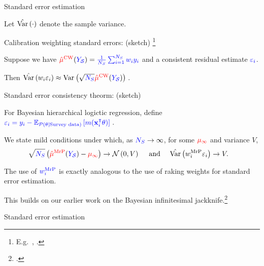 \begin{frame}[c]{Standard error estimation}


Let $\hat{\mathrm{Var}}\left(\cdot\right)$ denote the sample variance.

\begin{block}{Calibration weighting standard errors: (sketch)
    \footnote{E.g.~, \textcite{deville:1993:generalizedraking,fuller:2011:sampling}.}
}

Suppose we have $\textcolor{red}{\hat{\mu}^{\mathrm{CW}}}(\textcolor{blue}{\textcolor{blue}{Y_{\mathcal{S}}}}) = \textcolor{blue}{\frac{1}{{\textcolor{blue}{N_S}}} \sum_{i=1}^{\textcolor{blue}{N_S}} w_i y_i}$ and a
consistent residual estimate $\textcolor{blue}{\varepsilon_i}$.

Then $\hat{\mathrm{Var}}\left(w_i \varepsilon_i\right) \approx \mathrm{Var}_{}\left( \sqrt{{\textcolor{blue}{N_S}}} \textcolor{red}{\hat{\mu}^{\mathrm{CW}}}(\textcolor{blue}{\textcolor{blue}{Y_{\mathcal{S}}}})\right)\,$.

\end{block}
\pause

\begin{block}{Standard error consistency theorm: (sketch)}

For Bayesian hierarchical logictic regression, define
$\textcolor{blue}{\varepsilon_i = y_i - \mathbb{E}_{\textcolor{blue}{\mathcal{P}(\theta \vert \textrm{Survey data})}}\left[ m(\mathbf{x}_i^\intercal \theta)\right]\,}$.

We state mild conditions under which, as ${\textcolor{blue}{N_S}} \rightarrow \infty$,
for some $\textcolor{red}{\mu_\infty}$ and variance $V$,
$$
\begin{aligned}
    \sqrt{{\textcolor{blue}{N_S}}}\left(\textcolor{red}{\hat{\mu}^{\mathrm{MrP}}}(\textcolor{blue}{\textcolor{blue}{Y_{\mathcal{S}}}}) - \textcolor{red}{\mu_\infty} \right) \rightarrow{}&
    \mathcal{N}\left(0, V\right)
    \quad\textrm{ and }\quad
    \hat{\mathrm{Var}}\left( w_i^{\mathrm{MrP}} \varepsilon_i\right)
    \rightarrow{} V.
\end{aligned}
$$
\end{block}

The use of $\textcolor{blue}{w_i^{\mathrm{MrP}}}$ is exactly analogous to the use of raking weights
for standard error estimation.

This builds on our earlier work on the Bayesian
infinitesimal jackknife.\footcite{giordano:2024:bayesij}

\end{frame}



\begin{frame}[t]{Standard error estimation}
\BootstrapPlot{}
\end{frame}


